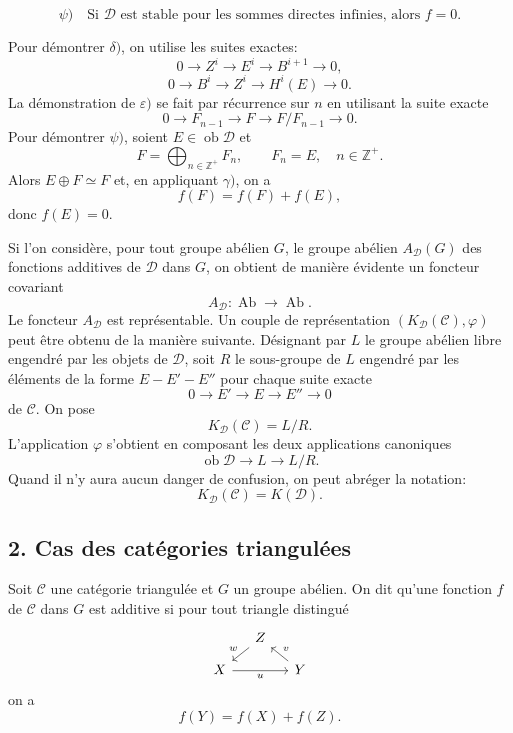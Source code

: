 \documentclass[11pt]{article}
\providecommand{\Ob}{\operatorname{ob}}
\providecommand{\cC}{\mathcal C}
\providecommand{\Ob}{\operatorname{ob}}
\providecommand{\Ab}{\operatorname{Ab}}
\providecommand{\cC}{\mathcal C}
\providecommand{\cD}{\mathcal D}
\providecommand{\Ab}{\operatorname{Ab}}
\providecommand{\Ob}{\operatorname{Ob}}
\providecommand{\Ob}{\operatorname{ob}}
\begin{document}
\[
\psi)\quad
\text{Si }\cD\text{ est stable pour les sommes directes infinies, alors }f=0.
\]

Pour démontrer $\delta)$, on utilise les suites exactes:
\[
0\longrightarrow Z^i\longrightarrow E^i\longrightarrow B^{i+1}\longrightarrow 0,
\]
\[
0\longrightarrow B^i\longrightarrow Z^i\longrightarrow H^i(E)\longrightarrow 0.
\]
La démonstration de $\varepsilon)$ se fait par récurrence sur $n$ en utilisant la suite exacte
\[
0\longrightarrow F_{n-1}\longrightarrow F\longrightarrow F/F_{n-1}\longrightarrow 0.
\]
Pour démontrer $\psi)$, soient $E\in\Ob\cD$ et
\[
F=\bigoplus_{n\in\mathbb Z^+}F_n,\qquad F_n=E,\quad n\in\mathbb Z^+.
\]
Alors $E\oplus F\simeq F$ et, en appliquant $\gamma)$, on a
\[
f(F)=f(F)+f(E),
\]
donc $f(E)=0$.

Si l'on considère, pour tout groupe abélien $G$, le groupe abélien $A_{\cD}(G)$ des fonctions additives de $\cD$ dans $G$, on obtient de manière évidente un foncteur covariant
\[
A_{\cD}:\Ab\longrightarrow\Ab.
\]
Le foncteur $A_{\cD}$ est représentable. Un couple de représentation $(K_{\cD}(\cC),\varphi)$ peut être obtenu de la manière suivante. Désignant par $L$ le groupe abélien libre engendré par les objets de $\cD$, soit $R$ le sous-groupe de $L$ engendré par les éléments de la forme $E-E'-E''$ pour chaque suite exacte
\[
0\longrightarrow E'\longrightarrow E\longrightarrow E''\longrightarrow 0
\]
de $\cC$. On pose
\[
K_{\cD}(\cC)=L/R.
\]
L'application $\varphi$ s'obtient en composant les deux applications canoniques
\[
\Ob\cD\longrightarrow L\longrightarrow L/R.
\]
Quand il n'y aura aucun danger de confusion, on peut abréger la notation:
\[
K_{\cD}(\cC)=K(\cD).
\]

\subsection*{2. Cas des catégories triangulées}

Soit $\cC$ une catégorie triangulée et $G$ un groupe abélien. On dit qu'une fonction $f$ de $\cC$ dans $G$ est additive si pour tout triangle distingué
\[
\begin{tikzcd}[column sep=small,row sep=small]
& Z \arrow[dl,"w"']\\
X \arrow[rr,"u"'] && Y \arrow[ul,"v"']
\end{tikzcd}
\]
on a
\[
f(Y)=f(X)+f(Z).
\]
\end{document}
